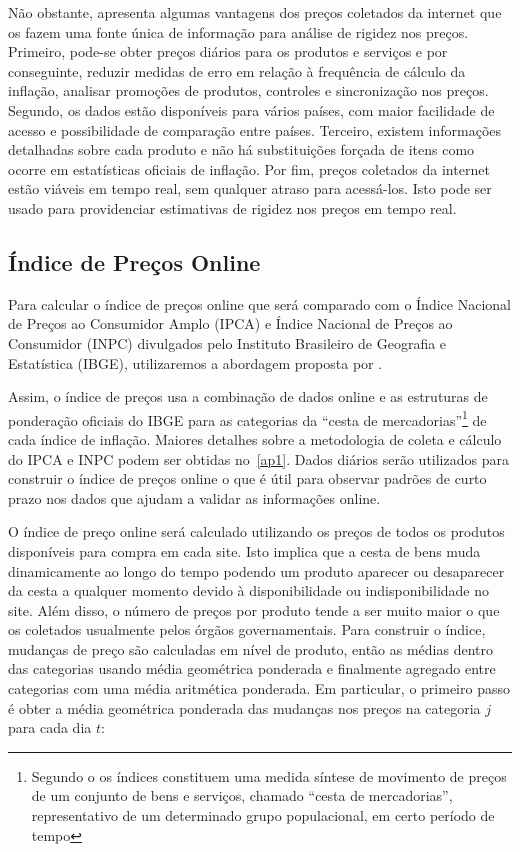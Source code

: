 \begin{algorithm}[H]
Não obstante, \citet{cavallo2010scraped} apresenta algumas vantagens dos preços coletados da internet que os fazem uma fonte única de informação para análise de rigidez nos preços. Primeiro, pode-se obter preços diários para os produtos e serviços e por conseguinte, reduzir medidas de erro em relação à frequência de cálculo da inflação, analisar promoções de produtos, controles e sincronização nos preços. Segundo, os dados estão disponíveis para vários países, com maior facilidade de acesso e possibilidade de comparação entre países. Terceiro, existem informações detalhadas sobre cada produto e não há substituições forçada de itens como ocorre em estatísticas oficiais de inflação. Por fim, preços coletados da internet estão viáveis em tempo real, sem qualquer atraso para acessá-los. Isto pode ser usado para providenciar estimativas de rigidez nos preços em tempo real.
  
\subsection{Índice de Preços Online}
  
Para calcular o índice de preços online que será comparado com o Índice Nacional de Preços ao Consumidor Amplo (IPCA) e Índice Nacional de Preços ao Consumidor (INPC) divulgados pelo Instituto Brasileiro de Geografia e Estatística (IBGE), utilizaremos a abordagem proposta por \citet{cavallo2010scraped}.
  
Assim, o índice de preços usa a combinação de dados online e as estruturas de ponderação oficiais do IBGE para as categorias da “cesta de mercadorias”\footnote[1]{Segundo o \citet{ibgemetodos} os índices constituem uma medida síntese de movimento de preços de um conjunto de bens e serviços, chamado “cesta de mercadorias”, representativo de um determinado grupo populacional, em certo período de tempo} de cada índice de inflação. Maiores detalhes sobre a metodologia de coleta e cálculo do IPCA e INPC podem ser obtidas no~\ref{ap1}. Dados diários serão utilizados para construir o índice de preços online o que é útil para observar padrões de curto prazo nos dados que ajudam a validar as informações online. 
  
O índice de preço online será calculado utilizando os preços de todos os produtos disponíveis para compra em cada site. Isto implica que a cesta de bens muda dinamicamente ao longo do tempo podendo um produto aparecer ou desaparecer da cesta a qualquer momento devido à disponibilidade ou indisponibilidade no site. Além disso, o número de preços por produto tende a ser muito maior o que os coletados usualmente pelos órgãos governamentais. 
Para construir o índice, mudanças de preço são calculadas em nível de produto, então as médias dentro das categorias usando média geométrica ponderada e finalmente agregado entre categorias com uma média aritmética ponderada. Em particular, o primeiro passo é obter a média geométrica ponderada das mudanças nos preços na categoria $j$ para cada dia $t$:


\end{algorithm}
